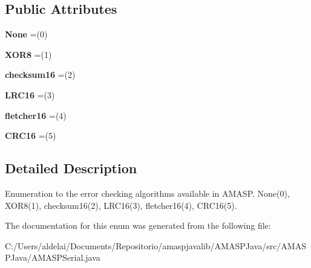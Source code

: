\subsection*{Public Attributes}
\begin{DoxyCompactItemize}
\item 
\mbox{\label{enum_a_m_a_s_p_java_1_1_a_m_a_s_p_serial_1_1_error_check_type_a34d4c1d882a40dd24d93ddc560eb432a}} 
{\bfseries None} =(0)
\item 
\mbox{\label{enum_a_m_a_s_p_java_1_1_a_m_a_s_p_serial_1_1_error_check_type_a02625d4b991df635681b6807e2db408d}} 
{\bfseries X\+O\+R8} =(1)
\item 
\mbox{\label{enum_a_m_a_s_p_java_1_1_a_m_a_s_p_serial_1_1_error_check_type_aa26cc649c4e59694c2d020746adf7525}} 
{\bfseries checksum16} =(2)
\item 
\mbox{\label{enum_a_m_a_s_p_java_1_1_a_m_a_s_p_serial_1_1_error_check_type_aafa3f632e99d5af14a500ad9103a2427}} 
{\bfseries L\+R\+C16} =(3)
\item 
\mbox{\label{enum_a_m_a_s_p_java_1_1_a_m_a_s_p_serial_1_1_error_check_type_ab5af9384027174e5aad3fd02dbd1b434}} 
{\bfseries fletcher16} =(4)
\item 
\mbox{\label{enum_a_m_a_s_p_java_1_1_a_m_a_s_p_serial_1_1_error_check_type_a8a58e93927fd268ee154aa605ed716e0}} 
{\bfseries C\+R\+C16} =(5)
\end{DoxyCompactItemize}


\subsection{Detailed Description}
Enumeration to the error checking algorithms available in A\+M\+A\+SP. None(0), X\+O\+R8(1), checksum16(2), L\+R\+C16(3), fletcher16(4), C\+R\+C16(5). 

The documentation for this enum was generated from the following file\+:\begin{DoxyCompactItemize}
\item 
C\+:/\+Users/aldelai/\+Documents/\+Repositorio/amaspjavalib/\+A\+M\+A\+S\+P\+Java/src/\+A\+M\+A\+S\+P\+Java/A\+M\+A\+S\+P\+Serial.\+java\end{DoxyCompactItemize}
